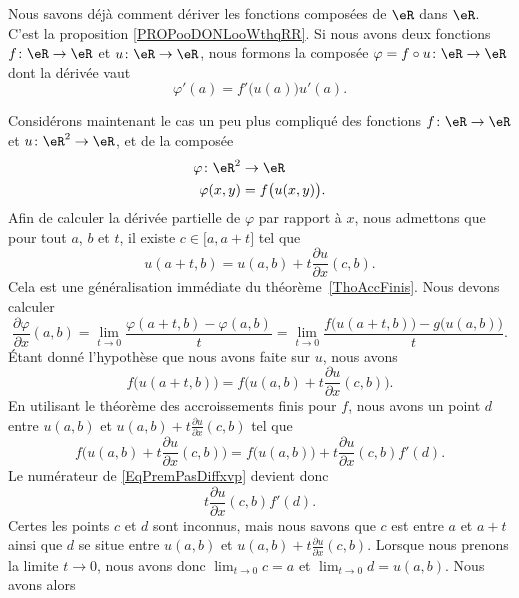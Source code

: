 Nous savons déjà comment dériver les fonctions composées de $\eR$ dans $\eR$. C'est la proposition \ref{PROPooDONLooWthqRR}. Si nous avons deux fonctions $f\colon \eR\to \eR$ et $u\colon \eR\to \eR$, nous formons la composée $\varphi=f\circ u\colon \eR\to \eR$ dont la dérivée vaut
\begin{equation}
	\varphi'(a)=f'\big( u(a) \big)u'(a).
\end{equation}

Considérons maintenant le cas un peu plus compliqué des fonctions $f\colon \eR\to \eR$ et $u\colon \eR^2\to \eR$, et de la composée
\begin{equation}
	\begin{aligned}
		\varphi\colon \eR^2&\to \eR \\
		\varphi(x,y)&= f\big( u(x,y) \big).
	\end{aligned}
\end{equation}
Afin de calculer la dérivée partielle de $\varphi$ par rapport à $x$, nous admettons que pour tout $a$, $b$ et $t$, il existe $c\in\mathopen[ a , a+t \mathclose]$ tel que
\begin{equation}
	u(a+t,b)=u(a,b)+t\frac{ \partial u }{ \partial x }(c,b).
\end{equation}
Cela est une généralisation immédiate du théorème~\ref{ThoAccFinis}. Nous devons calculer
\begin{equation}		\label{EqPremPasDiffxvp}
	\frac{ \partial \varphi }{ \partial x }(a,b)=\lim_{t\to 0} \frac{ \varphi(a+t,b)-\varphi(a,b) }{ t }=\lim_{t\to 0} \frac{ f\big( u(a+t,b) \big)-g\big( u(a,b) \big) }{ t }.
\end{equation}
Étant donné l'hypothèse que nous avons faite sur $u$, nous avons
\begin{equation}
	f\big( u(a+t,b) \big)=f\big( u(a,b)+t\frac{ \partial u }{ \partial x }(c,b) \big).
\end{equation}
En utilisant le théorème des accroissements finis pour $f$, nous avons un point $d$ entre $u(a,b)$ et $u(a,b)+t\frac{ \partial u }{ \partial x }(c,b)$ tel que
\begin{equation}
	f\big( u(a,b)+t\frac{ \partial u }{ \partial x }(c,b) \big)=f\big( u(a,b) \big)+t\frac{ \partial u }{ \partial x }(c,b)f'(d).
\end{equation}
Le numérateur de \eqref{EqPremPasDiffxvp} devient donc
\begin{equation}
	t\frac{ \partial u }{ \partial x }(c,b)f'(d).
\end{equation}
Certes les points $c$ et $d$ sont inconnus, mais nous savons que $c$ est entre $a$ et $a+t$ ainsi que $d$ se situe entre $u(a,b)$ et $u(a,b)+t\frac{ \partial u }{ \partial x }(c,b)$. Lorsque nous prenons la limite $t\to 0$, nous avons donc $\lim_{t\to 0} c=a$ et $\lim_{t\to 0} d=u(a,b)$. Nous avons alors
